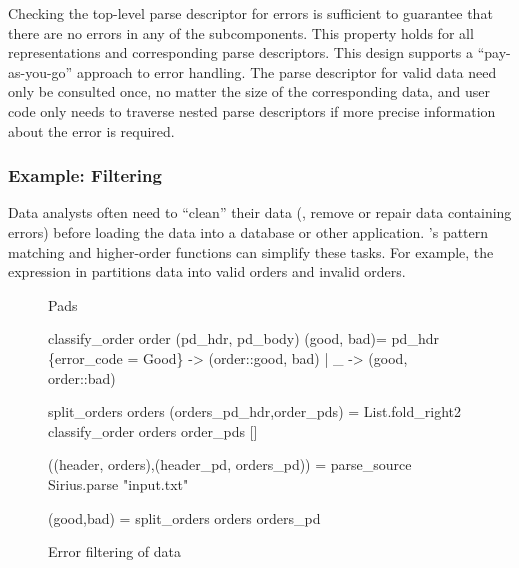 Checking the top-level parse descriptor for errors is sufficient to
guarantee that there are no errors in any of the subcomponents.  This
property holds for all representations and corresponding parse
descriptors.  This design supports a ``pay-as-you-go'' approach to
error handling. The parse descriptor for valid data need only be
consulted once, no matter the size of the corresponding data, and user
code only needs to traverse nested parse descriptors if more
precise information about the error is required.

\subsubsection{Example: Filtering}
\label{sec:ex-filter}

Data analysts often need to ``clean'' their data (\ie{}, remove or
repair data containing errors) before loading the data into a database
or other application.  \ocaml{}'s pattern matching and higher-order
functions can simplify these tasks.  For example, the expression in
 partitions \dibbler{} data into valid
orders and invalid orders.  

\begin{figure}
\begin{code}\scriptsize
{} Pads

 classify_order order (pd\_hdr, pd\_body) (good, bad)=
    pd\_hdr 
    \{error_code = Good\} -> (order::good, bad)
   | _                  -> (good, order::bad)

 split_orders orders (orders_pd_hdr,order_pds) = 
   List.fold_right2 classify_order orders order_pds []

 ((header, orders),(header_pd, orders_pd)) = 
   parse_source Sirius.parse "input.txt"

 (good,bad) = split_orders orders orders_pd\end{code} 
\caption{Error filtering of \dibbler{} data}
\label{fig:ex-data-clean}
\end{figure}

